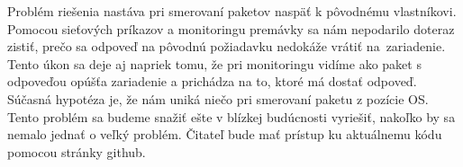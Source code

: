 Problém riešenia nastáva pri smerovaní paketov naspäť k pôvodnému vlastníkovi. Pomocou sieťových príkazov a monitoringu premávky sa nám nepodarilo doteraz zistiť, prečo sa odpoveď na pôvodnú požiadavku nedokáže vrátiť na~zariadenie. Tento úkon sa deje aj napriek tomu, že pri monitoringu vidíme ako paket s odpoveďou opúšťa zariadenie a prichádza na to, ktoré má dostať odpoveď. Súčasná hypotéza je, že nám uniká niečo pri smerovaní paketu z pozície OS. Tento problém sa budeme snažiť ešte v blízkej budúcnosti vyriešiť, nakoľko by sa nemalo jednať o veľký problém. Čitateľ bude mať prístup ku aktuálnemu kódu pomocou stránky github.   